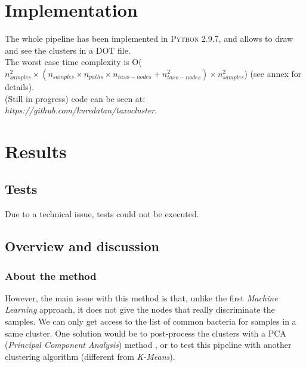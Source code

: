 \documentclass{report}
\begin{document}
\section{Implementation}

The whole pipeline has been implemented in \textsc{Python 2.9.7}, and allows to draw and see the clusters in a \textsc{DOT} file.\\

The worst case time complexity is O($n_{samples}^{2} \times (n_{samples} \times n_{paths} \times n_{taxo-nodes} + n_{taxo-nodes}^{2}) \times n_{samples}^{2}$) (see annex for details).\\

(Still in progress) code can be seen at: \\\emph{https://github.com/kuredatan/taxocluster}.

\section{Results}

\subsection{Tests}

Due to a technical issue, tests could not be executed.\\

\subsection{Overview and discussion}

\subsubsection{About the method}

However, the main issue with this method is that, unlike the first \emph{Machine Learning} approach, it does not give the nodes that really discriminate the samples. We can only get access to the list of common bacteria for samples in a same cluster. One solution would be to post-process the clusters with a \textsc{PCA} (\emph{Principal Component Analysis}) method \cite{PCA}, or to test this pipeline with another clustering algorithm (different from \emph{K-Means}).

\end{document}
